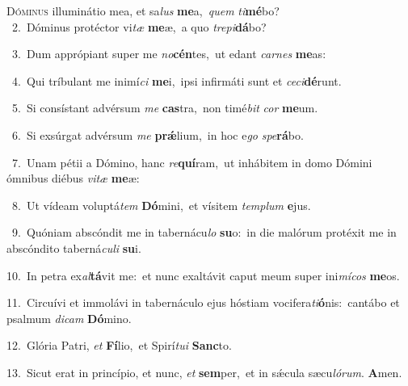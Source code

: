 \lettrine{\initial\textcolor{\initialcolor}{D}}{óminus} illuminátio mea, et sa\textit{lus} \textbf{me}\-a,~\star \textit{quem} \textit{ti}\-\textbf{mé}bo?\\
{\numbfont\textcolor{\numbcolor}{~2.}}~Dóminus protéctor vi\textit{tæ} \textbf{me}\-æ,~\star a quo \textit{tre}\-\textit{pi}\textbf{dá}bo?\par
{\numbfont\textcolor{\numbcolor}{~3.}}~Dum apprópiant super me \textit{no}\-\textbf{cén}tes,~\star ut edant \textit{car}\-\textit{nes} \textbf{me}\-as:\par
{\numbfont\textcolor{\numbcolor}{~4.}}~Qui tríbulant me inimí\textit{ci} \textbf{me}\-i,~\star ipsi infirmáti sunt et \textit{ce}\-\textit{ci}\textbf{dé}runt.\par
{\numbfont\textcolor{\numbcolor}{~5.}}~Si consístant advérsum \textit{me} \textbf{cas}\-tra,~\star non timé\textit{bit} \textit{cor} \textbf{me}\-um.\par
{\numbfont\textcolor{\numbcolor}{~6.}}~Si exsúrgat advérsum \textit{me} \textbf{prǽ}\-lium,~\star in hoc e\textit{go} \textit{spe}\-\textbf{rá}bo.\par
{\numbfont\textcolor{\numbcolor}{~7.}}~Unam pétii a Dómino, hanc \textit{re}\-\textbf{quí}ram,~\star ut inhábitem in domo Dómini ómnibus diébus \textit{vi}\-\textit{tæ} \textbf{me}\-æ:\par
{\numbfont\textcolor{\numbcolor}{~8.}}~Ut vídeam voluptá\textit{tem} \textbf{Dó}\-mini,~\star et vísitem \textit{tem}\-\textit{plum} \textbf{e}\-jus.\par
{\numbfont\textcolor{\numbcolor}{~9.}}~Quóniam abscóndit me in tabernácu\textit{lo} \textbf{su}\-o:~\star in die malórum protéxit me in abscóndito taberná\-\textit{cu}\-\textit{li} \textbf{su}\-i.\par
{\numbfont\textcolor{\numbcolor}{10.}}~In petra ex\-\textit{al}\-\textbf{tá}vit me:~\star et nunc exaltávit caput meum super ini\-\textit{mí}\-\textit{cos} \textbf{me}\-os.\par
{\numbfont\textcolor{\numbcolor}{11.}}~Circuívi et immolávi in tabernáculo ejus hóstiam vocifera\-\textit{ti}\-\textbf{ó}nis:~\star cantábo et psalmum \textit{di}\-\textit{cam} \textbf{Dó}\-mino.\par
{\numbfont\textcolor{\numbcolor}{12.}}~Glória Patri, \textit{et} \textbf{Fí}\-lio,~\star et Spirí\-\textit{tu}\-\textit{i} \textbf{Sanc}\-to.\par
{\numbfont\textcolor{\numbcolor}{13.}}~Sicut erat in princípio, et nunc, \textit{et} \textbf{sem}\-per,~\star et in sǽcula sæcu\-\textit{ló}\-\textit{rum}. \textbf{A}\-men.\par
